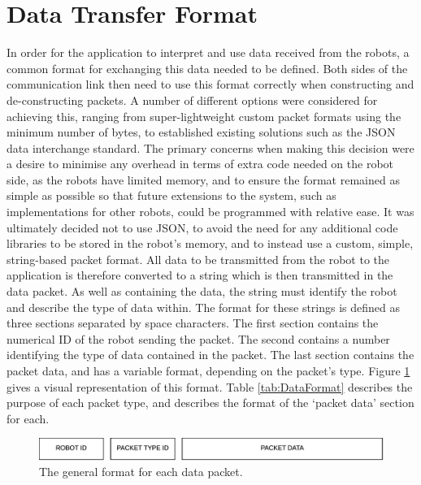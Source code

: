\section{Data Transfer Format} \label{DataTransferFormat}
In order for the application to interpret and use data received from the robots, a common format for exchanging this data needed to be defined. Both sides of the communication link then need to use this format correctly when constructing and de-constructing packets. A number of different options were considered for achieving this, ranging from super-lightweight custom packet formats using the minimum number of bytes, to established existing solutions such as the JSON data interchange standard. The primary concerns when making this decision were a desire to minimise any overhead in terms of extra code needed on the robot side, as the robots have limited memory, and to ensure the format remained as simple as possible so that future extensions to the system, such as implementations for other robots, could be programmed with relative ease. It was ultimately decided not to use JSON, to avoid the need for any additional code libraries to be stored in the robot's memory, and to instead use a custom, simple, string-based packet format. All data to be transmitted from the robot to the application is therefore converted to a string which is then transmitted in the data packet. As well as containing the data, the string must identify the robot and describe the type of data within. The format for these strings is defined as three sections separated by space characters. The first section contains the numerical ID of the robot sending the packet. The second contains a number identifying the type of data contained in the packet. The last section contains the packet data, and has a variable format, depending on the packet's type. Figure \ref{fig:DataFormat} gives a visual representation of this format. Table \ref{tab:DataFormat} describes the purpose of each packet type, and describes the format of the `packet data' section for each.

\begin{figure}
 \centering
 \includegraphics[scale=0.3]{Figures/DataFormat.png}
 \decoRule
 \caption[Data Format]{The general format for each data packet.}
 \label{fig:DataFormat}
\end{figure}

